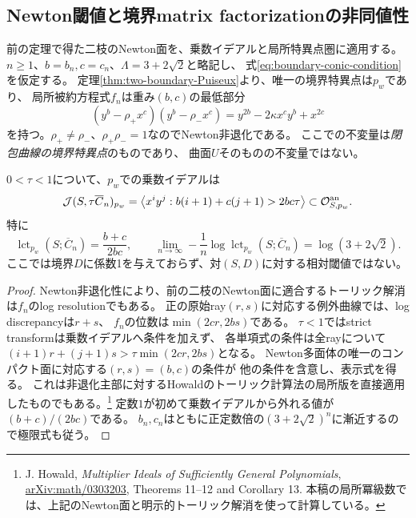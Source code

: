 \subsection{Newton閾値と境界matrix factorizationの非同値性}
\label{subsec:boundary-thresholds-mf}
前の定理で得た二枝のNewton面を、乗数イデアルと局所特異点圏に適用する。
$n\ge1$、$b=b_n,c=c_n$、$\Lambda=3+2\sqrt2$と略記し、
式\eqref{eq:boundary-conic-condition}を仮定する。
定理\ref{thm:two-boundary-Puiseux}より、唯一の境界特異点は$p_w$であり、
局所被約方程式$f_n$は重み$(b,c)$の最低部分
\[
 (y^b-\rho_+x^c)(y^b-\rho_-x^c)
 =y^{2b}-2\kappa x^cy^b+x^{2c}
\]
を持つ。$\rho_+\ne\rho_-$、$\rho_+\rho_-=1$なのでNewton非退化である。
ここでの不変量は\emph{閉包曲線の境界特異点}のものであり、
曲面$U$そのものの不変量ではない。

\begin{theorem}[局所対数標準閾値と乗数イデアル]
\label{thm:boundary-lct}
$0<\tau<1$について、$p_w$での乗数イデアルは
\[
 \mathcal J(S,\tau\overline C_n)_{p_w}
 =\left\langle x^iy^j:
 b(i+1)+c(j+1)>2bc\tau\right\rangle
 \subset\mathcal O_{S,p_w}^{\rm an}.
\]
特に
\begin{equation}\label{eq:pell-lct}
 \boxed{\operatorname{lct}_{p_w}(S;\overline C_n)
 =\frac{b+c}{2bc}},\qquad
 \lim_{n\to\infty}-\frac1n\log\operatorname{lct}_{p_w}(S;\overline C_n)
 =\log(3+2\sqrt2).
\end{equation}
ここでは境界$D$に係数1を与えておらず、対$(S,D)$に対する相対閾値ではない。
\end{theorem}
\begin{proof}
Newton非退化性により、前の二枝のNewton面に適合するトーリック解消は$f_n$のlog resolutionでもある。
正の原始ray$(r,s)$に対応する例外曲線では、log discrepancyは$r+s$、
$f_n$の位数は$\min(2cr,2bs)$である。
$\tau<1$ではstrict transformは乗数イデアルへ条件を加えず、
各単項式の条件は全rayについて
$(i+1)r+(j+1)s>\tau\min(2cr,2bs)$となる。
Newton多面体の唯一のコンパクト面に対応する$(r,s)=(b,c)$の条件が
他の条件を含意し、表示式を得る。
これは非退化主部に対するHowaldのトーリック計算法の局所版を直接適用したものでもある。\footnote{
J. Howald, \emph{Multiplier Ideals of Sufficiently General Polynomials},
\href{https://arxiv.org/abs/math/0303203}{arXiv:math/0303203}, Theorems 11--12 and Corollary 13.
本稿の局所冪級数では、上記のNewton面と明示的トーリック解消を使って計算している。}
定数$1$が初めて乗数イデアルから外れる値が$(b+c)/(2bc)$である。
$b_n,c_n$はともに正定数倍の$(3+2\sqrt2)^n$に漸近するので極限式も従う。
\end{proof}

